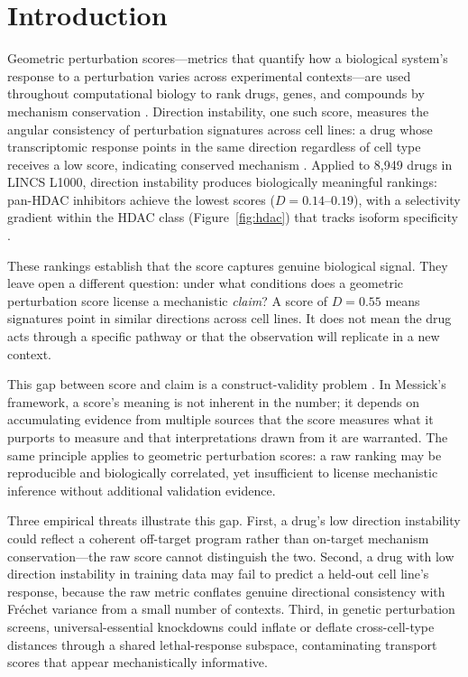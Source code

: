 \documentclass[10pt]{article}
\begin{document}
\section{Introduction}

Geometric perturbation scores---metrics that quantify how a biological
system's response to a perturbation varies across experimental
contexts---are used throughout computational biology to rank drugs, genes,
and compounds by mechanism conservation
\citep{lamb2006connectivity,subramanian2017next}. Direction instability,
one such score, measures the angular consistency of perturbation signatures
across cell lines: a drug whose transcriptomic response points in the same
direction regardless of cell type receives a low score, indicating conserved
mechanism \citep{tower2026drug}. Applied to 8{,}949 drugs in LINCS L1000,
direction instability produces biologically meaningful rankings: pan-HDAC
inhibitors achieve the lowest scores ($D = 0.14$--$0.19$), with a
selectivity gradient within the HDAC class (Figure~\ref{fig:hdac})
that tracks isoform specificity \citep{tower2026atlas}.

These rankings establish that the score captures genuine biological signal.
They leave open a different question: under what conditions does a
geometric perturbation score license a mechanistic \emph{claim}? A score
of $D = 0.55$ means signatures point in similar directions across cell
lines. It does not mean the drug acts through a specific pathway or that
the observation will replicate in a new context.

This gap between score and claim is a construct-validity problem
\citep{messick1995validity}. In Messick's framework, a score's meaning is
not inherent in the number; it depends on accumulating evidence from
multiple sources that the score measures what it purports to measure and
that interpretations drawn from it are warranted. The same principle
applies to geometric perturbation scores: a raw ranking may be
reproducible and biologically correlated, yet insufficient to license
mechanistic inference without additional validation evidence.

Three empirical threats illustrate this gap. First, a drug's low direction
instability could reflect a coherent off-target program rather than
on-target mechanism conservation---the raw score cannot distinguish the
two. Second, a drug with low direction instability in training data may
fail to predict a held-out cell line's response, because the raw metric
conflates genuine directional consistency with Fr\'echet variance from a
small number of contexts. Third, in genetic perturbation screens,
universal-essential knockdowns could inflate or deflate cross-cell-type
distances through a shared lethal-response subspace, contaminating
transport scores that appear mechanistically informative.
\end{document}
